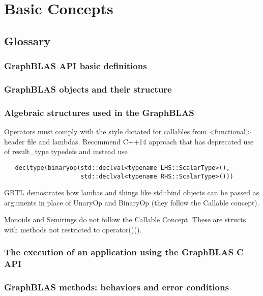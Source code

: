 \chapter{Basic Concepts}
\label{Chp:Concepts}

\section{Glossary}

\subsection{GraphBLAS API basic definitions}

\subsection{GraphBLAS objects and their structure}

\subsection{Algebraic structures used in the GraphBLAS}

Operators must comply with the style dictated for callables from {\sf <functional>} 
header file and lambdas.  Recommend C++14 approach that has deprecated use of {\sf result\_type}
typedefs and instead use
\begin{verbatim}
   decltype(binaryop(std::declval<typename LHS::ScalarType>(),
                     std::declval<typename RHS::ScalarType>()))
\end{verbatim}


GBTL demostrates how lambas and things like std::bind objects can be passed 
as arguments in place of UnaryOp and BinaryOp (they follow the Callable 
concept).  

Monoids and Semirings do not follow the Callable Concept.  These are
structs with methods not restricted to operator()().


\subsection{The execution of an application using the GraphBLAS C API}

\subsection{GraphBLAS methods: behaviors and error conditions}


